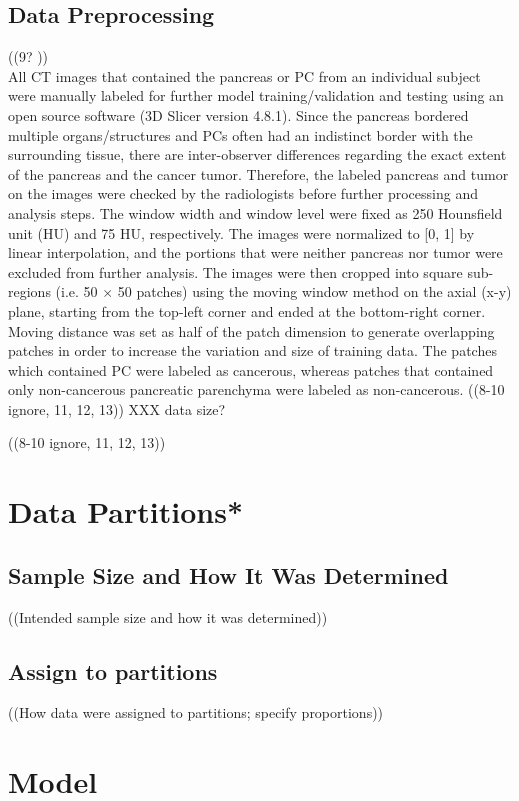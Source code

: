 \subsection{Data Preprocessing}
((9? )) \\
All CT images that contained the pancreas or PC from an individual subject were manually labeled for further model training/validation and testing using an open source software (3D Slicer version 4.8.1). 
Since the pancreas bordered multiple organs/structures and PCs often had an indistinct border with the surrounding tissue, there are inter-observer differences regarding the exact extent of the pancreas and the cancer tumor. Therefore, the labeled pancreas and tumor on the images were checked by the radiologists before further processing and analysis steps. The window width and window level were fixed as 250 Hounsfield unit (HU) and 75 HU, respectively. The images were normalized to [0, 1] by linear interpolation, and the portions that were neither pancreas nor tumor were excluded from further analysis. The images were then cropped into square sub-regions (i.e. 50 $ \times $ 50 patches) using the moving window method on the axial (x-y) plane, starting from the top-left corner and ended at the bottom-right corner. Moving distance was set as half of the patch dimension to generate overlapping patches in order to increase the variation and size of training data. The patches which contained PC were labeled as cancerous, whereas patches that contained only non-cancerous pancreatic parenchyma were labeled as non-cancerous.
((8-10 ignore, 11, 12, 13))
XXX data size?

((8-10 ignore, 11, 12, 13))
\section{Data Partitions*}
\subsection{Sample Size and How It Was Determined}
((Intended sample size and how it was determined))
\subsection{Assign to partitions}
((How data were assigned to partitions; specify proportions))


\section{Model}
